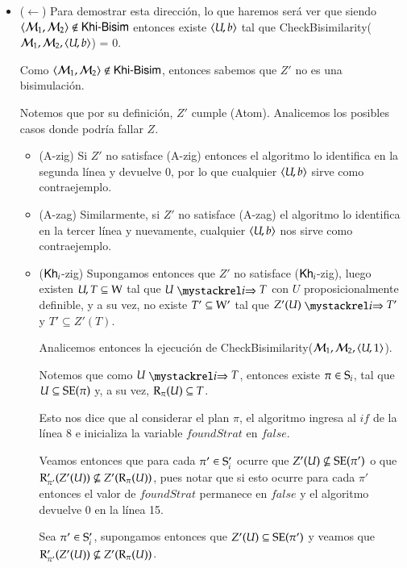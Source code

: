 \begin{demostracion}
\begin{itemize}
        \item ($\leftarrow$) Para demostrar esta dirección, lo que haremos será ver que siendo 
        $\tup{\modults_1,\modults_2} \not \in \KHiBisim$ entonces
        existe $\tup{U,b}$ tal que CheckBisimilarity($\modults_1,\modults_2,\tup{U,b}$) = 0.  
        
        Como $\tup{\modults_1,\modults_2} \not \in \KHiBisim$, entonces sabemos que $Z'$ no es una bisimulación.

        Notemos que por su definición, $Z'$ cumple (Atom). Analicemos los posibles casos donde podría fallar $Z$.

        \begin{itemize}
            \item (A-zig) Si $Z'$ no satisface (A-zig) entonces el algoritmo lo identifica en la segunda línea y devuelve 0, 
            por lo que cualquier $\tup{U,b}$ sirve como contraejemplo.
            \item (A-zag) Similarmente, si $Z'$ no satisface (A-zag) el algoritmo lo identifica en la tercer línea y 
            nuevamente, cualquier $\tup{U,b}$ nos sirve como contraejemplo.
            \item ($\khi$-zig) Supongamos entonces que $Z'$ no satisface ($\khi$-zig), luego existen $U, T \subseteq \W$ tal que
            $U \ultsExecAgi T$ con $U$ proposicionalmente definible, y a su vez, no existe $T' \subseteq \W'$ tal que $Z'(U) \ultsExecAgi T'$ y 
            $T' \subseteq Z'(T)$.

            Analicemos entonces la ejecución de CheckBisimilarity($\modults_1,\modults_2,\tup{U,1}$).

            Notemos que como $U \ultsExecAgi T$, entonces existe $\pi \in \S_i$, tal que $U \subseteq \sexec(\pi)$ y, 
            a su vez, $\R_\pi(U) \subseteq T$. 

            Esto nos dice que al considerar el plan $\pi$, el algoritmo ingresa al $if$ de la línea 8 e inicializa 
            la variable $foundStrat$ en $false$.

            Veamos entonces que para cada $\pi' \in \S_i'$ ocurre que $Z'(U) \not \subseteq \sexec(\pi')$ o que 
            $\R'_{\pi'}(Z'(U)) \not \subseteq Z'(\R_\pi(U))$, pues notar que si esto ocurre para cada $\pi'$ entonces 
            el valor de $foundStrat$ permanece en $false$ y el algoritmo devuelve 0 en la línea 15.

            Sea $\pi' \in \S_i'$, supongamos entonces que $Z'(U) \subseteq \sexec(\pi')$ y veamos que 
            $\R'_{\pi'}(Z'(U)) \not \subseteq Z'(\R_\pi(U))$.


\end{itemize}
\end{itemize}
\end{demostracion}
